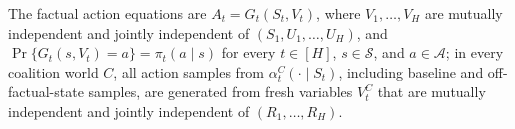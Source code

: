The factual action equations are \(A_t=G_t(S_t,V_t)\), where \(V_1,\ldots,V_H\) are mutually independent and jointly independent of \((S_1,U_1,\ldots,U_H)\), and \(\Pr\{G_t(s,V_t)=a\}=\pi_t(a\mid s)\) for every \(t\in[H]\), \(s\in\mathcal S\), and \(a\in\mathcal A\); in every coalition world \(C\), all action samples from \(\alpha_t^C(\cdot\mid S_t)\), including baseline and off-factual-state samples, are generated from fresh variables \(V_t^C\) that are mutually independent and jointly independent of \((R_1,\ldots,R_H)\).